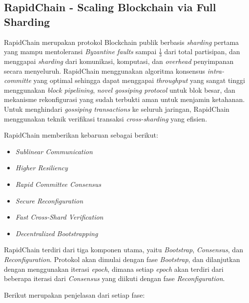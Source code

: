 \subsection{RapidChain - Scaling Blockchain via Full Sharding}
\label{subsec:rapidchain}

RapidChain merupakan protokol Blockchain publik berbasis \textit{sharding} pertama yang mampu mentoleransi \textit{Byzantine faults} sampai $\frac{1}{3}$ dari total partisipan, dan menggapai \textit{sharding} dari komunikasi, komputasi, dan \textit{overhead} penyimpanan secara menyeluruh. RapidChain menggunakan algoritma konsensus \textit{intra-committe} yang optimal sehingga dapat menggapai \textit{throughput} yang sangat tinggi menggunakan \textit{block pipelining}, \textit{novel gossiping protocol} untuk blok besar, dan mekanisme rekonfigurasi yang sudah terbukti aman untuk menjamin ketahanan. Untuk menghindari \textit{gossiping transactions} ke seluruh jaringan, RapidChain menggunakan teknik verifikasi transaksi \textit{cross-sharding} yang efisien.

RapidChain memberikan kebaruan sebagai berikut:

\begin{itemize}
  \item \textit{Sublinear Communication}
  \item \textit{Higher Resiliency}
  \item \textit{Rapid Committee Consensus}
  \item \textit{Secure Reconfiguration}
  \item \textit{Fast Cross-Shard Verification}
  \item \textit{Decentralized Bootstrapping}
\end{itemize}

RapidChain terdiri dari tiga komponen utama, yaitu \textit{Bootstrap}, \textit{Consensus}, dan \textit{Reconfiguration}. Protokol akan dimulai dengan fase \textit{Bootstrap}, dan dilanjutkan dengan menggunakan iterasi \textit{epoch}, dimana setiap \textit{epoch} akan terdiri dari beberapa iterasi dari \textit{Consensus} yang diikuti dengan fase \textit{Reconfiguration}.

Berikut merupakan penjelasan dari setiap fase:

